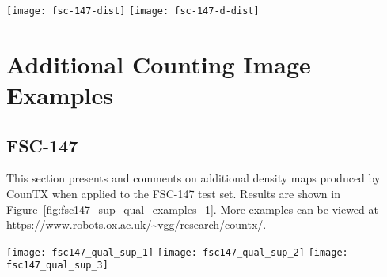 \documentclass{bmvc2k}
\begin{document}
\begin{figure*}[h!]
\begin{center}
\texttt{[image: fsc-147-dist]}
\texttt{[image: fsc-147-d-dist]}
\end{center}
   \caption{Histograms of the number of words in the class names for FSC-147 (left) and the number of words in the responses to the question ``what object should be counted?'' for FSC-147-D (right). The histograms show that the class descriptions in FSC-147-D are more prolific than the class names in FSC-147.}
\label{fig:fsc147_d_word_dist}
\end{figure*}

\newpage \section{Additional Counting Image Examples}
\label{sec:qual}
\subsection{FSC-147}
\label{sec:qual_fsc-147}
This section presents and comments on additional density maps produced by CounTX when applied to the FSC-147 \cite{m_Ranjan-etal-CVPR21} test set. Results are shown in Figure~\ref{fig:fsc147_sup_qual_examples_1}. More examples can be viewed at \href{https://www.robots.ox.ac.uk/~vgg/research/countx/}{https://www.robots.ox.ac.uk/\textasciitilde vgg/research/countx/}.
\begin{figure*}[h!]
\begin{center}
\texttt{[image: fsc147\_qual\_sup\_1]}
\texttt{[image: fsc147\_qual\_sup\_2]}
\texttt{[image: fsc147\_qual\_sup\_3]}
\end{center}
   \caption{Density maps produced by CounTX when applied to the FSC-147 \cite{m_Ranjan-etal-CVPR21} test set. CounTX is able to count the hot air balloons in the rightmost image in the top row despite how small they are. CounTX also correctly counts only the carrom board pieces and excludes the extraneous circular objects in the leftmost image in the third row. Despite the variance in the color and shape of the stamps, CounTX counts them.}
\label{fig:fsc147_sup_qual_examples_1}
\end{figure*}
\end{document}
